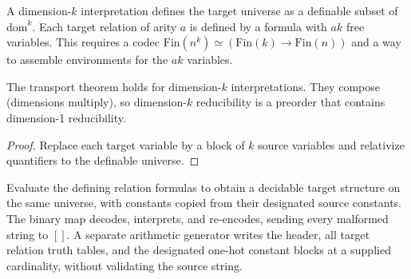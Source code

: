 \begin{definition}
  \label{def:desc-dim-k}
  A dimension-$k$ interpretation defines the target universe as a definable subset
  of $\mathrm{dom}^k$. Each target relation of arity $a$ is defined by a formula
  with $a k$ free variables. This requires a codec
  $\mathrm{Fin}(n^k) \simeq (\mathrm{Fin}(k) \to \mathrm{Fin}(n))$ and a way to
  assemble environments for the $a k$ variables.
\end{definition}

\begin{theorem}
  \label{thm:desc-dim-k-transport}
  \notready
  The transport theorem holds for dimension-$k$ interpretations. They compose
  (dimensions multiply), so dimension-$k$ reducibility is a preorder that
  contains dimension-1 reducibility.
\end{theorem}
\begin{proof}
  Replace each target variable by a block of $k$ source variables and relativize
  quantifiers to the definable universe.
\end{proof}

\begin{definition}
  \label{def:desc-encoded-interpretation}
  \leanok
  Evaluate the defining relation formulas to obtain a decidable target structure
  on the same universe, with constants copied from their designated source
  constants. The binary map decodes, interprets, and re-encodes, sending every
  malformed string to $[]$. A separate arithmetic generator writes the header,
  all target relation truth tables, and the designated one-hot constant blocks
  at a supplied cardinality, without validating the source string.
\end{definition}

